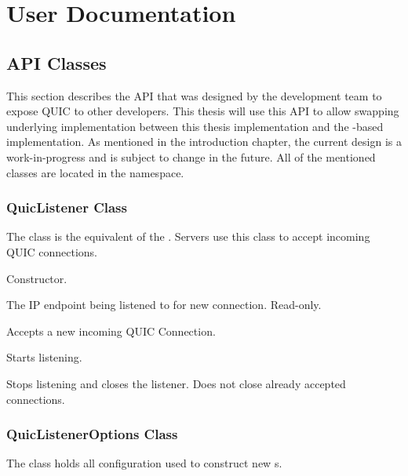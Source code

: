 \chapter{User Documentation}

\section{API Classes}\label{sec:06-api}

This section describes the API that was designed by the \dotnet{} development team to expose QUIC to
other developers. This thesis will use this API to allow swapping underlying implementation between
this thesis implementation and the \libmsquic{}-based implementation. As mentioned in the
introduction chapter, the current design is a work-in-progress and is subject to change in the
future. All of the mentioned classes are located in the  namespace.

\subsection{QuicListener Class}

The  class is the equivalent of the . Servers use this
class to accept incoming QUIC connections.

\begin{description}

     Constructor.

     The IP endpoint being listened to for new connection. Read-only.

    Accepts a new incoming QUIC Connection.

     Starts listening.

     Stops listening and closes the listener. Does not close already accepted connections.

\end{description}

\subsection{QuicListenerOptions Class}

The  class holds all configuration used to construct new s.

